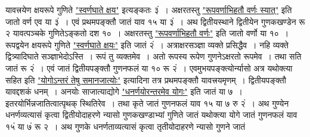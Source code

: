 \documentclass[11pt, openany]{book}
\begin{document}
\begin{sloppypar}
\noindent यावत्त्रयेण क्षयरूपे गुणिते \hyperref[1.9]{"स्वर्णघाते क्षय"} इत्यङ्कतः ३ं~। अक्षरतस्तु \hyperref[3.26]{"रूपवर्णाभिहतौ वर्णः स्यात्"} इति जातो वर्ण एव या ३ं~। एवं प्रथमपङ्क्तौ जातं याव १५ या ३ं~। अथ द्वितीयस्थाने द्वितीयेन गुणकखण्डेन रू २ यावत्पञ्चके गुणितेऽङ्कतो दश १०~। अक्षरतस्तु \hyperref[3.26]{"रूपवर्णाभिहतौ वर्णः"} इति जातो वर्णो या १०~। रूपद्वयेन क्षयरूपे गुणिते \hyperref[1.9]{"स्वर्णघाते क्षयः"} इति जातं २ं~। अत्राक्षरसञ्ज्ञा व्यक्ते प्रसिद्धैव~। नहि व्यक्ते द्वित्र्यादिघाते सञ्ज्ञाभेदोऽस्ति~। रूपं तु व्यक्तमेव~। अतो रूपस्य रूपेण गुणनेऽक्षरतो रूपमेव~। तथा सति जातं रू २ं~। एवं जातं द्वितीयपङ्क्तौ गुणनफलं या १० रू २ं~। एवमुभयपङ्क्त्योर्न्यासो  \;अत्र यथोक्त्या सहित इति \hyperref[3.22]{"योगोऽन्तरं तेषु समानजात्योः"} इत्यादिना तत्र प्रथमपङ्क्तौ यावत्त्रयमृणम्~। द्वितीयपङ्क्तौ यावद्दशकं धनम्~। अनयोः साजात्याद्योगे \hyperref[1.3]{"धनर्णयोरन्तरमेव योगः"} इति जातं या ७~। इतरयोर्भिन्नजातित्वात्पृथक् स्थितिरेव~। तथा कृते जातं गुणनफलं याव १५ या ७ रु २ं~। अथ गुण्येन धनर्णव्यत्यासं कृत्वा द्वितीयोदाहरणे न्यासो  \;गुणकखण्डाभ्यां गुणिते जातं  \;यथोक्त्या योगे जातं गुणनफलं याव १५ं या ७ं रू २~। अथ गुणके धनर्णताव्यत्यासं कृत्वा तृतीयोदाहरणे न्यासो  \;गुणने जातं \;{\scriptsize $\begin{matrix}

\end{matrix}}
\end{sloppypar}
\end{document}
